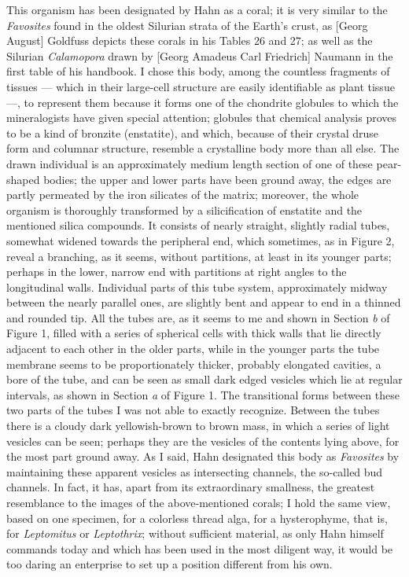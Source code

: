 \documentclass[a4paper, 12pt, oneside]{article}
\begin{document}
This organism has been designated by Hahn as a coral; it is very similar to the \emph{Favosites} found in the oldest Silurian strata of the Earth's crust, as [Georg August] Goldfuss depicts these corals in his Tables 26 and 27; as well as the Silurian \emph{Calamopora} drawn by [Georg Amadeus Carl Friedrich] Naumann in the first table of his handbook. I chose this body, among the countless fragments of tissues --- which in their large-cell structure are easily identifiable as plant tissue ---, to represent them because it forms one of the chondrite globules to which the mineralogists have given special attention; globules that chemical analysis proves to be a kind of bronzite (enstatite), and which, because of their crystal druse form and columnar structure, resemble a crystalline body more than all else. The drawn individual is an approximately medium length section of one of these pear-shaped bodies; the upper and lower parts have been ground away, the edges are partly permeated by the iron silicates of the matrix; moreover, the whole organism is thoroughly transformed by a silicification of enstatite and the mentioned silica compounds. It consists of nearly straight, slightly radial tubes, somewhat widened towards the peripheral end, which sometimes, as in Figure 2, reveal a branching, as it seems, without partitions, at least in its younger parts; perhaps in the lower, narrow end with partitions at right angles to the longitudinal walls. Individual parts of this tube system, approximately midway between the nearly parallel ones, are slightly bent and appear to end in a thinned and rounded tip. All the tubes are, as it seems to me and shown in Section \emph{b} of Figure 1, filled with a series of spherical cells with thick walls that lie directly adjacent to each other in the older parts, while in the younger parts the tube membrane seems to be proportionately thicker, probably elongated cavities, a bore of the tube, and can be seen as small dark edged vesicles which lie at regular intervals, as shown in Section \emph{a} of Figure 1. The transitional forms between these two parts of the tubes I was not able to exactly recognize. Between the tubes there is a cloudy dark yellowish-brown to brown mass, in which a series of light vesicles can be seen; perhaps they are the vesicles of the contents lying above, for the most part ground away. As I said, Hahn designated this body as \emph{Favosites} by maintaining these apparent vesicles as intersecting channels, the so-called bud channels. In fact, it has, apart from its extraordinary smallness, the greatest resemblance to the images of the above-mentioned corals; I hold the same view, based on one specimen, for a colorless thread alga, for a hysterophyme, that is, for \emph{Leptomitus} or \emph{Leptothrix}; without sufficient material, as only Hahn himself commands today and which has been used in the most diligent way, it would be too daring an enterprise to set up a position different from his own.
\end{document}
